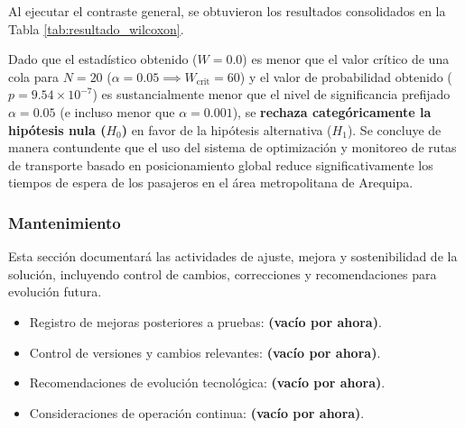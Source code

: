 Al ejecutar el contraste general, se obtuvieron los resultados consolidados en la Tabla \ref{tab:resultado_wilcoxon}.

\begin{table}[H]
\centering
\caption{Resultados de la prueba de Wilcoxon (Muestras Relacionadas)}
\label{tab:resultado_wilcoxon}
\end{table}

Dado que el estadístico obtenido ($W = 0.0$) es menor que el valor crítico de una cola para $N=20$ ($\alpha=0.05 \implies W_{\text{crit}} = 60$) y el valor de probabilidad obtenido ($p = 9.54 \times 10^{-7}$) es sustancialmente menor que el nivel de significancia prefijado $\alpha = 0.05$ (e incluso menor que $\alpha = 0.001$), se \textbf{rechaza categóricamente la hipótesis nula ($H_0$)} en favor de la hipótesis alternativa ($H_1$). Se concluye de manera contundente que el uso del sistema de optimización y monitoreo de rutas de transporte basado en posicionamiento global reduce significativamente los tiempos de espera de los pasajeros en el área metropolitana de Arequipa.


\subsubsection{Mantenimiento}

Esta sección documentará las actividades de ajuste, mejora y sostenibilidad de la solución, incluyendo control de cambios, correcciones y recomendaciones para evolución futura.

\begin{itemize}
    \item Registro de mejoras posteriores a pruebas: \textbf{(vacío por ahora)}.
    \item Control de versiones y cambios relevantes: \textbf{(vacío por ahora)}.
    \item Recomendaciones de evolución tecnológica: \textbf{(vacío por ahora)}.
    \item Consideraciones de operación continua: \textbf{(vacío por ahora)}.
\end{itemize}

